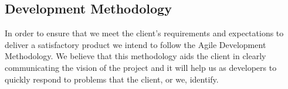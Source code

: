 \subsection{Development Methodology}
In order to ensure that we meet the client's requirements and expectations to deliver a satisfactory product we intend to follow the Agile Development Methodology. We believe that this methodology aids the client in clearly communicating the vision of the project and it will help us as developers to quickly respond to problems that the client, or we, identify. 